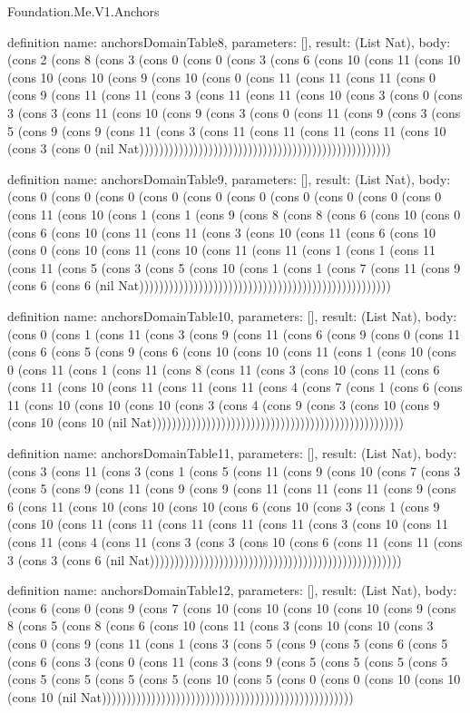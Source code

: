 \begin{lexlean}{Foundation.Me.V1.Anchors}
\begin{semanticmodule}
definition{
  name: anchorsDomainTable8,
  parameters: [],
  result: (List Nat),
  body: (cons 2 (cons 8 (cons 3 (cons 0 (cons 0 (cons 3 (cons 6 (cons 10 (cons 11 (cons 10 (cons 10 (cons 10 (cons 9 (cons 10 (cons 0 (cons 11 (cons 11 (cons 11 (cons 0 (cons 9 (cons 11 (cons 11 (cons 3 (cons 11 (cons 11 (cons 10 (cons 3 (cons 0 (cons 3 (cons 3 (cons 11 (cons 10 (cons 9 (cons 3 (cons 0 (cons 11 (cons 9 (cons 3 (cons 5 (cons 9 (cons 9 (cons 11 (cons 3 (cons 11 (cons 11 (cons 11 (cons 11 (cons 10 (cons 3 (cons 0 (nil Nat)))))))))))))))))))))))))))))))))))))))))))))))))))
}

definition{
  name: anchorsDomainTable9,
  parameters: [],
  result: (List Nat),
  body: (cons 0 (cons 0 (cons 0 (cons 0 (cons 0 (cons 0 (cons 0 (cons 0 (cons 0 (cons 0 (cons 11 (cons 10 (cons 1 (cons 1 (cons 9 (cons 8 (cons 8 (cons 6 (cons 10 (cons 0 (cons 6 (cons 10 (cons 11 (cons 11 (cons 3 (cons 10 (cons 11 (cons 6 (cons 10 (cons 0 (cons 10 (cons 11 (cons 10 (cons 11 (cons 11 (cons 1 (cons 1 (cons 11 (cons 11 (cons 5 (cons 3 (cons 5 (cons 10 (cons 1 (cons 1 (cons 7 (cons 11 (cons 9 (cons 6 (cons 6 (nil Nat)))))))))))))))))))))))))))))))))))))))))))))))))))
}

definition{
  name: anchorsDomainTable10,
  parameters: [],
  result: (List Nat),
  body: (cons 0 (cons 1 (cons 11 (cons 3 (cons 9 (cons 11 (cons 6 (cons 9 (cons 0 (cons 11 (cons 6 (cons 5 (cons 9 (cons 6 (cons 10 (cons 10 (cons 11 (cons 1 (cons 10 (cons 0 (cons 11 (cons 1 (cons 11 (cons 8 (cons 11 (cons 3 (cons 10 (cons 11 (cons 6 (cons 11 (cons 10 (cons 11 (cons 11 (cons 11 (cons 4 (cons 7 (cons 1 (cons 6 (cons 11 (cons 10 (cons 10 (cons 10 (cons 3 (cons 4 (cons 9 (cons 3 (cons 10 (cons 9 (cons 10 (cons 10 (nil Nat)))))))))))))))))))))))))))))))))))))))))))))))))))
}

definition{
  name: anchorsDomainTable11,
  parameters: [],
  result: (List Nat),
  body: (cons 3 (cons 11 (cons 3 (cons 1 (cons 5 (cons 11 (cons 9 (cons 10 (cons 7 (cons 3 (cons 5 (cons 9 (cons 11 (cons 9 (cons 9 (cons 11 (cons 11 (cons 11 (cons 9 (cons 6 (cons 11 (cons 10 (cons 10 (cons 10 (cons 6 (cons 10 (cons 3 (cons 1 (cons 9 (cons 10 (cons 11 (cons 11 (cons 11 (cons 11 (cons 11 (cons 3 (cons 10 (cons 11 (cons 11 (cons 4 (cons 11 (cons 3 (cons 3 (cons 10 (cons 6 (cons 11 (cons 11 (cons 3 (cons 3 (cons 6 (nil Nat)))))))))))))))))))))))))))))))))))))))))))))))))))
}

definition{
  name: anchorsDomainTable12,
  parameters: [],
  result: (List Nat),
  body: (cons 6 (cons 0 (cons 9 (cons 7 (cons 10 (cons 10 (cons 10 (cons 10 (cons 9 (cons 8 (cons 5 (cons 8 (cons 6 (cons 10 (cons 11 (cons 3 (cons 10 (cons 10 (cons 3 (cons 0 (cons 9 (cons 11 (cons 1 (cons 3 (cons 5 (cons 9 (cons 5 (cons 6 (cons 5 (cons 6 (cons 3 (cons 0 (cons 11 (cons 3 (cons 9 (cons 5 (cons 5 (cons 5 (cons 5 (cons 5 (cons 5 (cons 5 (cons 5 (cons 10 (cons 5 (cons 0 (cons 0 (cons 10 (cons 10 (cons 10 (nil Nat)))))))))))))))))))))))))))))))))))))))))))))))))))
}


\end{semanticmodule}
\end{lexlean}
